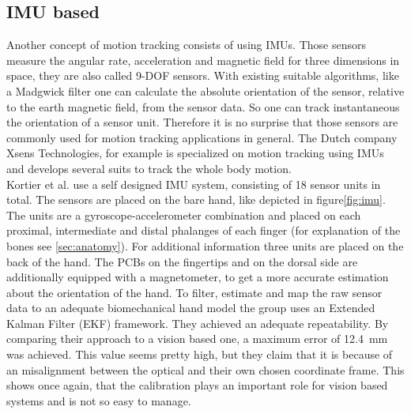 \subsection{IMU based} \label{subsec:approaches:IMU}
Another concept of motion tracking consists of using IMUs. Those sensors measure the angular rate, acceleration and magnetic field for three dimensions in space, they are also called 9-DOF sensors. With existing suitable algorithms, like a Madgwick filter \cite{madgwick2010efficient} one can calculate the absolute orientation of the sensor, relative to the earth magnetic field, from the sensor data. So one can track instantaneous the orientation of a sensor unit. Therefore it is no surprise that those sensors are commonly used for motion tracking applications in general. The Dutch company Xsens Technologies, for example is specialized on motion tracking using IMUs and develops several suits to track the whole body motion.\\
Kortier et al. use a self designed IMU system, consisting of 18 sensor units in total. The sensors are placed on the bare hand, like depicted in figure\ref{fig:imu}. The units are a gyroscope-accelerometer combination and placed on each proximal, intermediate and distal phalanges of each finger (for explanation of the bones see \ref{sec:anatomy}). For additional information three units are placed on the back of the hand. The PCBs on the fingertips and on the dorsal side are additionally equipped with a magnetometer, to get a more accurate estimation about the orientation of the hand. To filter, estimate and map the raw sensor data to an adequate biomechanical hand model the group uses an Extended Kalman Filter (EKF) framework. They achieved an adequate repeatability. By comparing their approach to a vision based one, a maximum error of \SI{12.4}{mm} was achieved. This value seems pretty high, but they claim that it is because of an misalignment between the optical and their own chosen coordinate frame. This shows once again, that the calibration plays an important role for vision based systems and is not so easy to manage.\\
